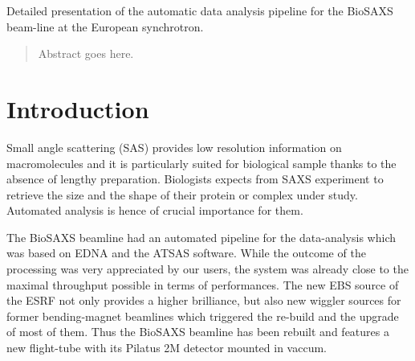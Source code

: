 \documentclass[preprint]{iucr}              %
\begin{document}

\maketitle                        %

\begin{synopsis}
Detailed presentation of the automatic data analysis pipeline for the BioSAXS beam-line at the European synchrotron.  
\end{synopsis}

\begin{abstract}
Abstract goes here.
\end{abstract}



\section{Introduction}
Small angle scattering (SAS) provides low resolution information on macromolecules and it is  
particularly suited for biological sample thanks to the absence of lengthy preparation. 
Biologists expects from SAXS experiment to retrieve the size and the shape of their protein or complex under study.
Automated analysis is hence of crucial importance for them.

The BioSAXS\cite{BM29paper} beamline had an automated pipeline for the data-analysis which was based on EDNA\cite{EDNA} and the ATSAS\cite{ATSAS2}
software. 
While the outcome of the processing was very appreciated by our users, the system was already close to the maximal throughput possible in terms of performances. 
The new EBS source \cite{EBS} of the ESRF not only provides a higher brilliance, but also new wiggler sources for former bending-magnet beamlines which triggered the re-build and the upgrade of most of them. 
Thus the BioSAXS beamline has been rebuilt and features a new flight-tube with its Pilatus 2M detector mounted in vaccum. 
\end{document}
